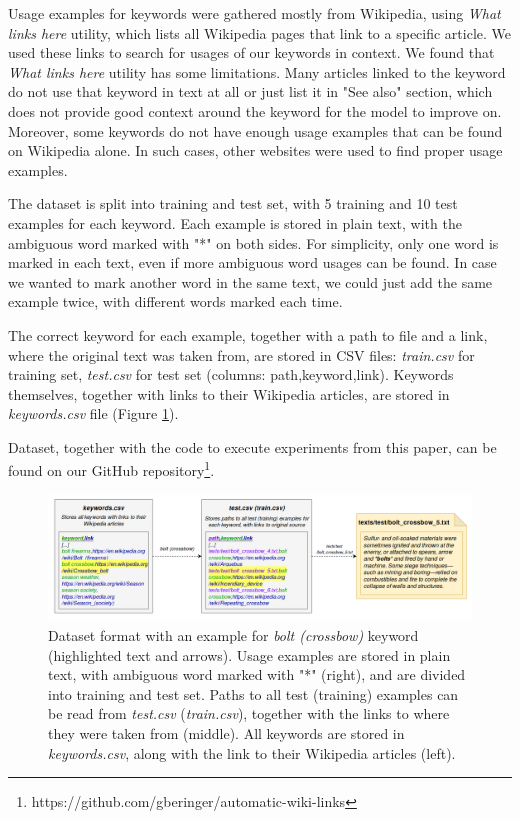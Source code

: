 \documentclass{llncs}
\begin{document}
Usage examples for keywords were gathered mostly from Wikipedia, using \textit{What links here} utility, which lists all Wikipedia pages that link to a specific article.
We used these links to search for usages of our keywords in context.
We found that \textit{What links here} utility has some limitations.
Many articles linked to the keyword do not use that keyword in text at all or just list it in "See also" section, which does not provide good context around the keyword for the model to improve on.
Moreover, some keywords do not have enough usage examples that can be found on Wikipedia alone.
In such cases, other websites were used to find proper usage examples.

The dataset is split into training and test set, with 5 training and 10 test examples for each keyword.
Each example is stored in plain text, with the ambiguous word marked with "*" on both sides.
For simplicity, only one word is marked in each text, even if more ambiguous word usages can be found.
In case we wanted to mark another word in the same text, we could just add the same example twice, with different words marked each time.

The correct keyword for each example, together with a path to file and a link, where the original text was taken from, are stored in CSV files: \textit{train.csv} for training set, \textit{test.csv} for test set (columns: path,keyword,link).
Keywords themselves, together with links to their Wikipedia articles, are stored in \textit{keywords.csv} file (Figure \ref{fig:dataset_format}).

Dataset, together with the code to execute experiments from this paper, can be found on our GitHub repository\footnote{https://github.com/gberinger/automatic-wiki-links}.

\begin{figure}
    \centering
    \caption{Dataset format with an example for \textit{bolt (crossbow)} keyword (highlighted text and arrows). Usage examples are stored in plain text, with ambiguous word marked with "*" (right), and are divided into training and test set. Paths to all test (training) examples can be read from \textit{test.csv} (\textit{train.csv}), together with the links to where they were taken from (middle). All keywords are stored in \textit{keywords.csv}, along with the link to their Wikipedia articles (left).}
    \label{fig:dataset_format}
    \includegraphics[scale=0.35]{res/dataset_format.png}
\end{figure}
\end{document}
